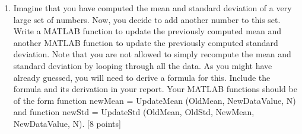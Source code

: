 \documentclass[11pt]{article}
\begin{document}
\begin{enumerate}
\item Imagine that you have computed the mean and standard deviation of a very large set of numbers. Now, you decide to add another number to this set. Write a MATLAB function to update the previously computed mean and another MATLAB function to update the previously computed standard deviation. Note that you are not allowed to simply recompute the mean and standard deviation by looping through all the data. As you might have already guessed, you will need to derive a formula for this. Include the formula and its derivation in your report. Your MATLAB functions should be of the form
function newMean = UpdateMean (OldMean, NewDataValue, N)  and function newStd = UpdateStd (OldMean, OldStd, NewMean, NewDataValue, N). \textsf{[8 points]}


\end{enumerate}
\end{document}
